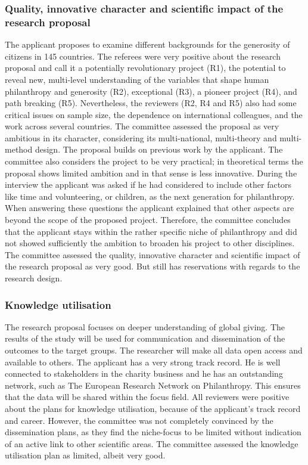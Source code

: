 \documentclass[twocolumn, serif, rga, numeric]{jote-article}
\begin{document}
{}\subsubsection*{Quality, innovative character and scientific impact of the research proposal}

The applicant proposes to examine different backgrounds for the generosity of citizens in 145 countries. The referees were very positive about the research proposal and call it a potentially revolutionary project (R1), the potential to reveal new, multi-level understanding of the variables that shape human philanthropy and generosity (R2), exceptional (R3), a pioneer project (R4), and path breaking (R5). Nevertheless, the reviewers (R2, R4 and R5) also had some critical issues on sample size, the dependence on international colleagues, and the work across several countries. The committee assessed the proposal as very ambitious in its character, considering its multi-national, multi-theory and multi-method design. The proposal builds on previous work by the applicant. The committee also considers the project to be very practical; in theoretical terms the proposal shows limited ambition and in that sense is less innovative. During the interview the applicant was asked if he had considered to include other factors like time and volunteering, or children, as the next generation for philanthropy. When answering these questions the applicant explained that other aspects are beyond the scope of the proposed project. Therefore, the committee concludes that the applicant stays within the rather specific niche of philanthropy and did not showed sufficiently the ambition to broaden his project to other disciplines. The committee assessed the quality, innovative character and scientific impact of the research proposal as very good. But still has reservations with regards to the research design.

 {}\subsubsection*{Knowledge utilisation} 
The research proposal focuses on deeper understanding of global giving. The results of the study will be used for communication and dissemination of the outcomes to the target groups. The researcher will make all data open access and available to others. The applicant has a very strong track record. He is well connected to stakeholders in the charity business and he has an outstanding network, such as The European Research Network on Philanthropy. This ensures that the data will be shared within the focus field. All reviewers were positive about the plans for knowledge utilisation, because of the applicant’s track record and career. However, the committee was not completely convinced by the dissemination plans, as they find the niche-focus to be limited without indication of an active link to other scientific areas. The committee assessed the knowledge utilisation plan as limited, albeit very good.
\end{document}
